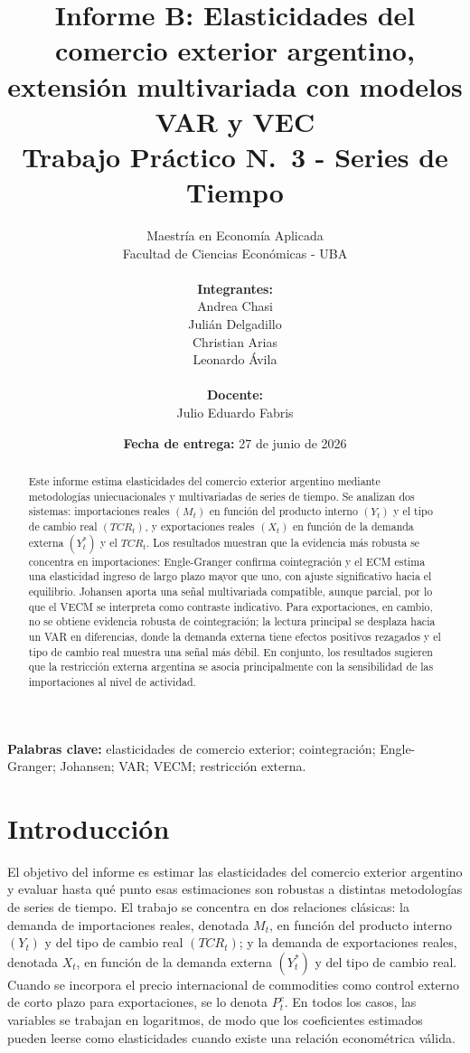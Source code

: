 \documentclass[11pt,a4paper]{article}
\title{%
	\textbf{Informe B: Elasticidades del comercio exterior argentino, extensión multivariada con modelos VAR y VEC} \\
	\vspace{0.6em}
	\large Trabajo Práctico N.\textdegree~3 - Series de Tiempo
}
\author{
	Maestría en Economía Aplicada \\
	Facultad de Ciencias Económicas - UBA \\
	\\
	\textbf{Integrantes:} \\
	Andrea Chasi \\
	Julián Delgadillo \\
	Christian Arias \\
	Leonardo Ávila \\
	\\
	\textbf{Docente:} \\
	Julio Eduardo Fabris
}
\date{\textbf{Fecha de entrega:} 27 de junio de 2026}
\begin{document}
	\maketitle

	\begin{abstract}
		Este informe estima elasticidades del comercio exterior argentino mediante
		metodologías uniecuacionales y multivariadas de series de tiempo. Se analizan
		dos sistemas: importaciones reales \((M_t)\) en función del producto interno
		\((Y_t)\) y el tipo de cambio real \((TCR_t)\), y exportaciones reales
		\((X_t)\) en función de la demanda externa \((Y_t^*)\) y el \(TCR_t\). Los
		resultados muestran que la evidencia más robusta se concentra en
		importaciones: Engle-Granger confirma cointegración y el ECM estima una
		elasticidad ingreso de largo plazo mayor que uno, con ajuste significativo
		hacia el equilibrio. Johansen aporta una señal multivariada compatible, aunque
		parcial, por lo que el VECM se interpreta como contraste indicativo. Para
		exportaciones, en cambio, no se obtiene evidencia robusta de cointegración; la
		lectura principal se desplaza hacia un VAR en diferencias, donde la demanda
		externa tiene efectos positivos rezagados y el tipo de cambio real muestra una
		señal más débil. En conjunto, los resultados sugieren que la restricción
		externa argentina se asocia principalmente con la sensibilidad de las
		importaciones al nivel de actividad.
	\end{abstract}

	\noindent\textbf{Palabras clave:} elasticidades de comercio exterior;
	cointegración; Engle-Granger; Johansen; VAR; VECM; restricción externa.

	\newpage

	\section{Introducción}
	\label{sec:introduccion}

	El objetivo del informe es estimar las elasticidades del comercio exterior
	argentino y evaluar hasta qué punto esas estimaciones son robustas a distintas
	metodologías de series de tiempo. El trabajo se concentra en dos relaciones
	clásicas: la demanda de importaciones reales, denotada \(M_t\), en función del
	producto interno \((Y_t)\) y del tipo de cambio real \((TCR_t)\); y la demanda
	de exportaciones reales, denotada \(X_t\), en función de la demanda externa
	\((Y_t^*)\) y del tipo de cambio real. Cuando se incorpora el precio
	internacional de commodities como control externo de corto plazo para
	exportaciones, se lo denota \(P_t^c\). En todos los casos, las variables se
	trabajan en logaritmos, de modo que los coeficientes estimados pueden leerse
	como elasticidades cuando existe una relación econométrica válida.
\end{document}
